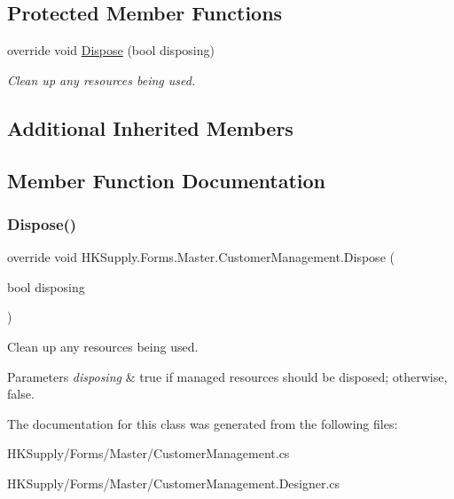\subsection*{Protected Member Functions}
\begin{DoxyCompactItemize}
\item 
override void \mbox{\hyperlink{class_h_k_supply_1_1_forms_1_1_master_1_1_customer_management_a3ecb762babe54f6e25edb87033beb8f6}{Dispose}} (bool disposing)
\begin{DoxyCompactList}\small\item\em Clean up any resources being used. \end{DoxyCompactList}\end{DoxyCompactItemize}
\subsection*{Additional Inherited Members}


\subsection{Member Function Documentation}
\mbox{\label{class_h_k_supply_1_1_forms_1_1_master_1_1_customer_management_a3ecb762babe54f6e25edb87033beb8f6}} 
\subsubsection{\texorpdfstring{Dispose()}{Dispose()}}
{\footnotesize\ttfamily override void H\+K\+Supply.\+Forms.\+Master.\+Customer\+Management.\+Dispose (\begin{DoxyParamCaption}\item[{bool}]{disposing }\end{DoxyParamCaption})\hspace{0.3cm}{\ttfamily [protected]}}



Clean up any resources being used. 


\begin{DoxyParams}{Parameters}
{\em disposing} & true if managed resources should be disposed; otherwise, false.\\
\hline
\end{DoxyParams}


The documentation for this class was generated from the following files\+:\begin{DoxyCompactItemize}
\item 
H\+K\+Supply/\+Forms/\+Master/Customer\+Management.\+cs\item 
H\+K\+Supply/\+Forms/\+Master/Customer\+Management.\+Designer.\+cs\end{DoxyCompactItemize}
